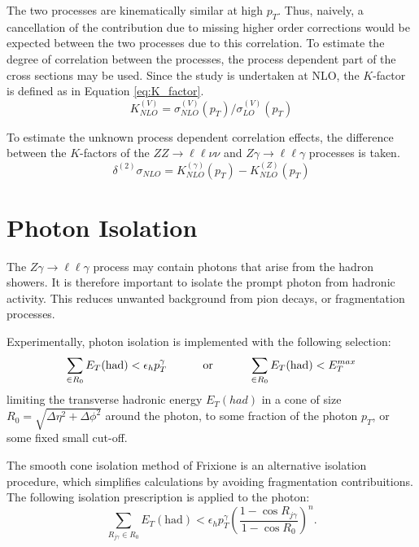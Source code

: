 \documentclass[11pt,a4paper,openright,twoside]{report}
\newcommand{\ZZ}{$ZZ\to \ell\ell\nu\nu$ }
\newcommand{\Zg}{$Z\gamma\to \ell\ell\gamma$ }
\begin{document}
The two processes are kinematically similar at high $p_T$. Thus, naively, a cancellation of the contribution due to missing higher order corrections would be expected between the two processes due to this correlation. To estimate the degree of correlation between the processes, the process dependent part of the cross sections may be used. Since the study is undertaken at NLO, the $K$-factor is defined as in Equation \ref{eq:K_factor}.
\begin{equation}
K_{NLO}^{(V)} = \sigma_{NLO}^{(V)}(p_T)/\sigma_{LO}^{(V)}(p_T)
\label{eq:K_factor}
\end{equation}

To estimate the unknown process dependent correlation effects, the difference between the $K$-factors of the \ZZ and \Zg processes is taken.
\begin{equation}
\delta^{(2)} \sigma_{NLO} = K_{NLO}^{(\gamma)}(p_T) - K_{NLO}^{(Z)}(p_T)
\label{eq:K_factor_unc}
\end{equation}

\section{Photon Isolation}
The \Zg process may contain photons that arise from the hadron showers. It is therefore important to isolate the prompt photon from hadronic activity. This reduces unwanted background from pion decays, or fragmentation processes.

Experimentally, photon isolation is implemented with the following selection:
\begin{equation}
\sum_{\in R_0} E_T(\text{had}) < \epsilon_h p_T^\gamma \text{\hspace{1cm} or \hspace{1cm}} \sum_{\in R_0} E_T(\text{had}) < E_T^{max}
\label{eq:photon_isol}
\end{equation}
limiting the transverse hadronic energy $E_T(had)$ in a cone of size $R_0 = \sqrt{\Delta\eta^2 + \Delta\phi^2}$ around the photon, to some fraction of the photon $p_T$, or some fixed small cut-off.

The smooth cone isolation method of Frixione \cite{frixione} is an alternative isolation procedure, which simplifies calculations by avoiding fragmentation contribuitions. The following isolation prescription is applied to the photon:
\begin{equation}
	\sum_{R_{j\gamma} \in R_0} E_T(\text{had}) < \epsilon_h p_T^\gamma \left(\frac{1-\cos R_{j\gamma}}{1-\cos R_0}\right)^n.
\label{eq:frix_isol}
\end{equation}
\end{document}
